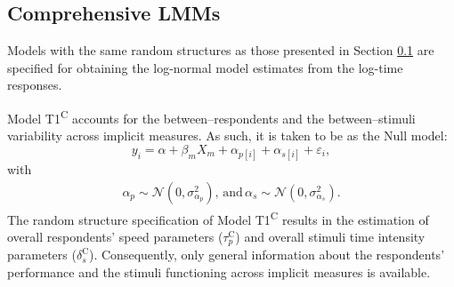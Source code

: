 \documentclass[12pt]{book}
\begin{document}
\subsection{Comprehensive LMMs}\label{sec:clmms}

Models with the same random structures as those presented in Section \ref{sec:clmms} are specified for obtaining the log-normal model estimates from the log-time responses.

Model T1\textsuperscript{C} accounts for the between--respondents and the between--stimuli variability across implicit measures. As such, it is taken to be as the Null model: 
%
\begin{equation}\label{eq:typeNullt}
	y_{i} = \alpha + \beta_mX_m + \alpha_{p[i]} +  \alpha_{s[i]} + \varepsilon_{i},
\end{equation}
with
\begin{align}
	\alpha_{p} \sim  \mathcal{N} ( 0, \sigma_{\alpha_p}^2), \, \text{and} \,	\alpha_{s}  \sim  \mathcal{N} (0,\sigma_{\alpha_s}^2). 
\end{align}
The random structure specification of Model T1\textsuperscript{C} results in the estimation of overall respondents' speed parameters ($\tau_p^\text{C}$) and overall stimuli time intensity parameters ($\delta_s^\text{C}$). Consequently, only general information about the respondents' performance and the stimuli functioning across implicit measures is available.
\end{document}
